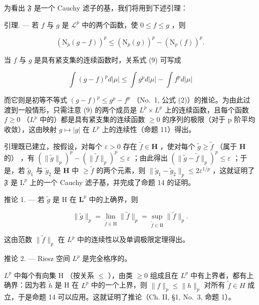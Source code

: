 为看出 \(\mathfrak{F}\) 是一个 Cauchy 滤子的基，我们将用到下述引理：

引理. --- 若 \(f\) 与 \(g\) 是 \(\mathcal{L}^p\) 中的两个函数，使 \(0 \leqslant f \leqslant g\) ，则

\[
\left(\mathrm{N} _ {p} (g - f)\right) ^ {p} \leqslant \left(\mathrm{N} _ {p} (g)\right) ^ {p} - \left(\mathrm{N} _ {p} (f)\right) ^ {p}.\tag{9}
\]

当 \(f\) 与 \(g\) 是具有紧支集的连续函数时，关系式 (9) 可写成

\[
\int (g - f) ^ {p} d | \mu | \leqslant \int g ^ {p} d | \mu | - \int f ^ {p} d | \mu |
\]

而它则是初等不等式 \((g - f)^{p} \leqslant g^{p} - f^{p}\) （No.~1, 公式 (2)）的推论。为由此过渡到一般情形，只需注意 (9) 的两个成员是 \(L^{p} \times L^{p}\) 上的连续函数，且每个函数 \(f \geqslant 0\) （\(L^{p}\) 中的）都是具有紧支集的连续函数 \(\geqslant 0\) 的序列的极限（对于 p 阶平均收敛），这由映射 \(g \mapsto |g|\) 在 \(L^{p}\) 上的连续性（命题 11）得出。

引理既已建立，按假设，对每个 \(\varepsilon > 0\) 存在 \(\widetilde{f} \in \mathbf{H}\) ，使对每个 \(\widetilde{g} \geqslant \widetilde{f}\) （属于 \(\mathbf{H}\) 的） ，有 \((\|\widetilde{g}\|_p)^p - (\|\widetilde{f}\|_p)^p \leqslant \varepsilon\) ；由此得出 \((\|\widetilde{g} - \widetilde{f}\|_p)^p \leqslant \varepsilon\) ；于是，若 \(\widetilde{g}_1\) 与 \(\widetilde{g}_2\) 是 \(\mathbf{H}\) 中 \(\geqslant \widetilde{f}\) 的两个元素，则 \(\|\widetilde{g}_1 - \widetilde{g}_2\|_p \leqslant 2\varepsilon^{1/p}\) ，这就证明了 \(\mathfrak{F}\) 是 \(\mathrm{L}^p\) 上的一个 Cauchy 滤子基，并完成了命题 14 的证明。

推论 1. --- 若 \(\widetilde{g}\) 是 H 在 \(\mathbf{L}^p\) 中的上确界，则

\[
\| \widetilde {g} \| _ {p} = \lim _ {\widetilde {f} \in \mathrm{H}} \| \widetilde {f} \| _ {p} = \sup _ {\widetilde {f} \in \mathrm{H}} \| \widetilde {f} \| _ {p}.\tag{10}
\]

这由范数 \(\|\widetilde{f}\|_{p}\) 在 \(L^{p}\) 中的连续性以及单调极限定理得出。

推论 2. --- Riesz 空间 \(L^{p}\) 是完全格序的。

\(L^{p}\) 中每个有向集 H （按关系 \(\leqslant\) ），由类 \(\geqslant 0\) 组成且在 \(L^{p}\) 中有上界者，都有上确界：因为若 \(\widetilde{h}\) 是 H 在 \(L^{p}\) 中的一个上界，则 \(\|f\|_{p} \leqslant \|h\|_{p}\) 对所有 \(\widetilde{f} \in H\) 成立，于是命题 14 可以应用。这就证明了推论（Ch. II, §1, No.~3, 命题 1）。

